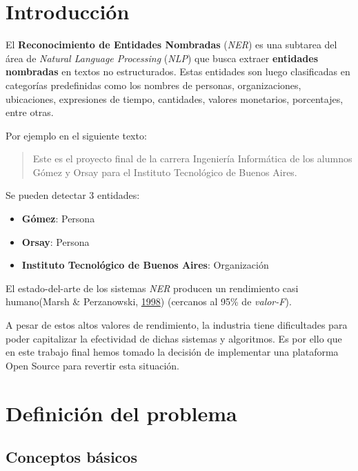 \documentclass[12pt,a4paper,]{scrartcl}
\providecommand{\tightlist}{%
  \setlength{\itemsep}{0pt}\setlength{\parskip}{0pt}}
\begin{document}
{
\setcounter{tocdepth}{2}
\tableofcontents
}
\listoffigures
\newpage

\hypertarget{intro}{%
\section{Introducción}\label{intro}}

El \textbf{Reconocimiento de Entidades Nombradas} (\emph{NER}) es una subtarea del área de \emph{Natural Language Processing} (\emph{NLP}) que busca extraer \textbf{entidades nombradas} en textos no estructurados. Estas entidades son luego clasificadas en categorías predefinidas como los nombres de personas, organizaciones, ubicaciones, expresiones de tiempo, cantidades, valores monetarios, porcentajes, entre otras.

Por ejemplo en el siguiente texto:

\begin{quote}
Este es el proyecto final de la carrera Ingeniería Informática de los alumnos Gómez y Orsay para el Instituto Tecnológico de Buenos Aires.
\end{quote}

Se pueden detectar 3 entidades:

\begin{itemize}
\tightlist
\item
  \textbf{Gómez}: Persona
\item
  \textbf{Orsay}: Persona
\item
  \textbf{Instituto Tecnológico de Buenos Aires}: Organización
\end{itemize}

El estado-del-arte de los sistemas \emph{NER} producen un rendimiento casi humano(Marsh \& Perzanowski, \protect\hyperlink{ref-marsh-perzanowski-1998-muc}{1998}) (cercanos al 95\% de \emph{valor-F}).

A pesar de estos altos valores de rendimiento, la industria tiene dificultades para poder capitalizar la efectividad de dichas sistemas y algoritmos.
Es por ello que en este trabajo final hemos tomado la decisión de implementar una plataforma Open Source para revertir esta situación.

\newpage

\hypertarget{problem-definition}{%
\section{Definición del problema}\label{problem-definition}}

\hypertarget{conceptos-buxe1sicos}{%
\subsection{Conceptos básicos}\label{conceptos-buxe1sicos}}
\end{document}
